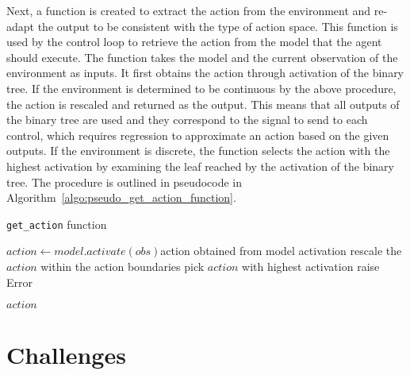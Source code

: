 Next, a function is created to extract the action from the environment and re-adapt the output to be consistent with the type of action space. This function is used by the control loop to retrieve the action from the model that the agent should execute. The function takes the model and the current observation of the environment as inputs. It first obtains the action through activation of the binary tree. If the environment is determined to be continuous by the above procedure, the action is rescaled and returned as the output. This means that all outputs of the binary tree are used and they correspond to the signal to send to each control, which requires regression to approximate an action based on the given outputs. If the environment is discrete, the function selects the action with the highest activation by examining the leaf reached by the activation of the binary tree. The procedure is outlined in pseudocode in Algorithm~\ref{algo:pseudo_get_action_function}.

\begin{algorithm}
\caption{\texttt{get\_action} function}
\label{algo:pseudo_get_action_function}
\begin{algorithmic}
\State $action \gets model.activate(obs)$\Comment action obtained from model activation
    \State rescale the $action$ within the action boundaries
    \State pick $action$ with highest activation
\Else
    \State raise Error
\EndIf

\Return $action$
\EndFunction
\end{algorithmic}
\end{algorithm}

\section{Challenges}
